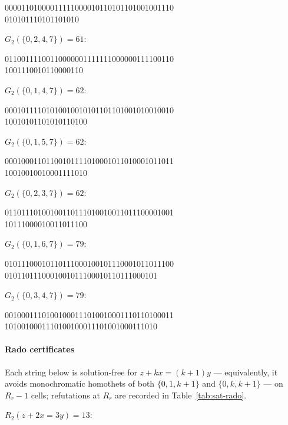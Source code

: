 \documentclass[12pt]{article}
\begin{document}
\begin{center}\ttfamily\footnotesize
00001101000011111000010110101101001001110\\
010101110101101010
\end{center}
$G_{2}(\{0,2,4,7\})=61$:

\begin{center}\ttfamily\footnotesize
01100111100110000001111111000000111100110\\
1001110010110000110
\end{center}
$G_{2}(\{0,1,4,7\})=62$:

\begin{center}\ttfamily\footnotesize
00010111101010010010101101101001010010010\\
10010101101010110100
\end{center}
$G_{2}(\{0,1,5,7\})=62$:

\begin{center}\ttfamily\footnotesize
00010001101100101111010001011010001011011\\
10010010010001111010
\end{center}
$G_{2}(\{0,2,3,7\})=62$:

\begin{center}\ttfamily\footnotesize
01101110100100110111010010011011100001001\\
10111000010011011100
\end{center}
$G_{2}(\{0,1,6,7\})=79$:

\begin{center}\ttfamily\footnotesize
01011100010110111000100101110001011011100\\
0101101110001001011100010110111000101
\end{center}
$G_{2}(\{0,3,4,7\})=79$:

\begin{center}\ttfamily\footnotesize
00100011101001000111010010001110110100011\\
1010010001110100100011101001000111010
\end{center}

\paragraph{Rado certificates}
Each string below is solution-free for $z+kx=(k+1)y$ --- equivalently,
it avoids monochromatic homothets of both $\{0,1,k+1\}$ and
$\{0,k,k+1\}$ --- on $R_{r}-1$ cells; refutations at $R_{r}$ are
recorded in Table~\ref{tab:sat-rado}.

$R_{2}(z+2x=3y)=13$:
\end{document}

